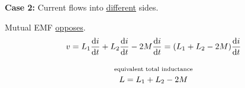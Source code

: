 \begin{multicols}{2}
{        \textbf{Case 2:} Current flows into \ul{different} sides. \\[0mm]
         

         Mutual EMF \ul{opposes}.
        \begin{gather*}
            v
                = L_1 \frac{\diff{i}}{\diff{t}} + L_2 \frac{\diff{i}}{\diff{t}} - 2M \frac{\diff{i}}{\diff{t}}
                = \parens*{L_1 + L_2 - 2M} \frac{\diff{i}}{\diff{t}} \\[\abovedisplayskip]
            \MathOverLabel{\text{equivalent total inductance}}{L = L_1 + L_2 - 2M}
        \end{gather*}


    }

\end{multicols}

